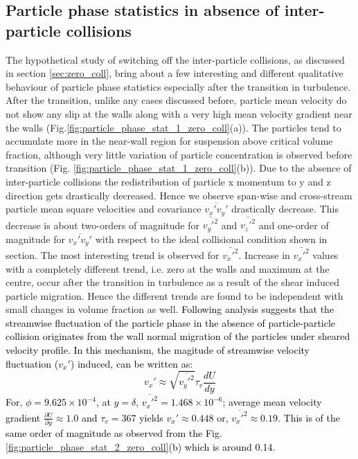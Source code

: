 \documentclass[aip,graphicx]{revtex4-1}
\begin{document}
\subsection{Particle phase statistics in absence of inter-particle collisions}
\label{sec:Particle Phase Statistics zero_coll}
The hypothetical study of switching off the inter-particle collisions, as discussed in section \ref{sec:zero_coll}, bring about a few interesting and different qualitative behaviour of particle phase statistics especially after the transition in turbulence. After the transition, unlike any cases discussed before, particle mean velocity do not show any slip at the walls along with a very high mean velocity gradient near the walls (Fig.\ref{fig:particle_phase_stat_1_zero_coll}(a)). The particles tend to accumulate more in the near-wall region for suspension above critical volume fraction, although very little variation of particle concentration is observed before transition (Fig. \ref{fig:particle_phase_stat_1_zero_coll}(b)). Due to the absence of inter-particle collisions the redistribution of particle x momentum to y and z direction gets drastically decreased. Hence we observe span-wise and cross-stream particle mean square velocities and covariance $\overline{v_x'v_y'}$ drastically decrease.  This decrease is about two-orders of magnitude for $\bar{v_y'^2}$ and $\bar{v_z'^2}$ and one-order of magnitude for $\overline{v_x'v_y'}$ with respect to the ideal collisional condition shown in section\label{sec:Particle Phase Statistics}. 
The most interesting trend is observed for $\bar{v_x'^2}$. Increase in $\bar{v_x'^2}$ values with a completely different trend, i.e. zero at the walls and maximum at the centre, occur after the transition in turbulence as a result of the  shear induced particle migration. Hence the different trends are found to be independent with small changes in volume fraction as well. \textcolor{black}{Following analysis suggests that the streamwise fluctuation of the particle phase in the absence of particle-particle collision originates from the wall normal migration of the particles under sheared velocity profile. In this mechanism, the magitude of streamwise velocity fluctuation ($v_x'$) induced, can be written as:
\begin{equation}
    v_x'\approx\sqrt{\overline{v_y'^2}}\tau_v \frac{d U}{d y}
\end{equation} 
For, $\phi=9.625\times10^{-4}$, at $y=\delta$, $\overline{v_x'^2}=1.468\times10^{-6}$; average mean velocity gradient $\frac{\partial U}{\partial y}\approx1.0$
and $\tau_v=367$ yields 
\begin{math}
v_x'\approx 0.448
\end{math}
or, 
\begin{math}
\overline{v_x'^2}\approx 0.19
\end{math}. 
This is of the same order of magnitude as observed from the Fig. \ref{fig:particle_phase_stat_2_zero_coll}(b) which is around 0.14.}
\end{document}
